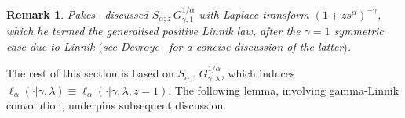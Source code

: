 \documentclass[a4paper,12pt]{article}
\newtheorem{remark}{Remark}
\begin{document}
{{%

\begin{remark}
\label{rem:Linnik}
Pakes~{\rm \cite[(4.4)]{Pakes95}} discussed  $S_{\alpha;z}\, G_{\gamma, 1}^{1/\alpha}$ with 
Laplace transform $(1+zs^\alpha)^{-\gamma}$, which he termed the  generalised positive  Linnik law,
after the  $\gamma=1$ symmetric case due to Linnik $($see Devroye~{\rm \cite{Devroye_Linnik}} for a concise discussion of the latter$)$.
\end{remark}

The rest of this section is based on  $S_{\alpha;1}\, G_{\gamma, \lambda}^{1/\alpha}$,  which induces
$\ell_\alpha(\cdot \vert \gamma, \lambda)\equiv\ell_\alpha(\cdot \vert \gamma, \lambda,z=1)$.
The following lemma,  involving gamma-Linnik convolution,  underpins subsequent discussion.

}}
\end{document}
